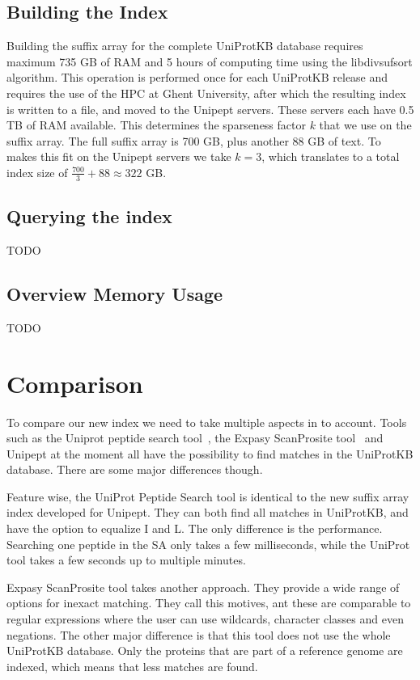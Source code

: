 \documentclass[10pt]{article}
\begin{document}
\begin{multicols}{2}
        \subsection{Building the Index}
        Building the suffix array for the complete UniProtKB database requires maximum 735 GB of RAM and 5 hours of computing time using the libdivsufsort algorithm.
        This operation is performed once for each UniProtKB release and requires the use of the HPC at Ghent University, after which the resulting index is written to a file, and moved to the Unipept servers.
        These servers each have 0.5 TB of RAM available.
        This determines the sparseness factor $k$ that we use on the suffix array.
        The full suffix array is 700 GB, plus another 88 GB of text.
        To makes this fit on the Unipept servers we take $k = 3$, which translates to a total index size of $\frac{700}{3} + 88 \approx 322$ GB\@.

        \subsection{Querying the index}
        TODO

        \subsection{Overview Memory Usage}
        TODO


        \section{Comparison}\label{sec:comparison}
        To compare our new index we need to take multiple aspects in to account.
        Tools such as the Uniprot peptide search tool~\cite{uniprot_search_site, uniprot_search_paper}, the Expasy ScanProsite tool~\cite{scanprosite} and Unipept at the moment all have the possibility to find matches in the UniProtKB database.
        There are some major differences though.

        Feature wise, the UniProt Peptide Search tool is identical to the new suffix array index developed for Unipept.
        They can both find all matches in UniProtKB, and have the option to equalize I and L\@.
        The only difference is the performance.
        Searching one peptide in the SA only takes a few milliseconds, while the UniProt tool takes a few seconds up to multiple minutes.

        Expasy ScanProsite tool takes another approach.
        They provide a wide range of options for inexact matching.
        They call this motives, ant these are comparable to regular expressions where the user can use wildcards, character classes and even negations.
        The other major difference is that this tool does not use the whole UniProtKB database.
        Only the proteins that are part of a reference genome are indexed, which means that less matches are found.


\end{multicols}
\end{document}
